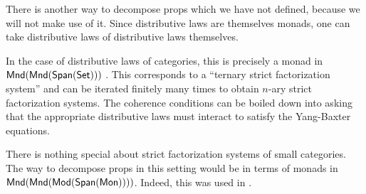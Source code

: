\begin{aside}
There is another way to decompose props which we have not defined, because we will not make use of it.    Since distributive laws are themselves monads, one can take distributive laws of distributive laws themselves. 


In the case of distributive laws of categories, this is precisely a monad in\\ ${\sf Mnd}({\sf Mnd}(\mathsf{Span}(\mathsf{Set})))$ \cite{iterdist}.  This corresponds to a ``ternary strict factorization system'' and can be iterated finitely many times to obtain $n$-ary strict factorization systems. The coherence conditions can be boiled down into asking that the appropriate distributive laws must interact to satisfy the Yang-Baxter equations.

There is nothing special about strict factorization systems of small categories.  The way to decompose props in this setting would be in terms of monads in\\ ${\sf Mnd}({\sf Mnd}({\sf Mod}(\mathsf{Span}({\sf Mon}))))$.  Indeed, this was used in \cite[Proposition 3.3., Example 2.34]{ih}.
\end{aside}
%
%
%
%


